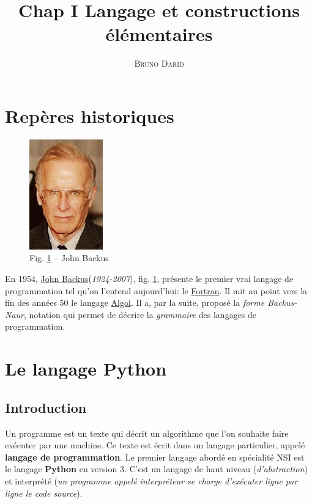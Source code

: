 \documentclass[11pt,french]{article}
\title{Chap I Langage et constructions élémentaires}
\author{\textsc{Bruno Darid}}
\makeatletter
\def\maxwidth{\ifdim\Gin@nat@width>\linewidth\linewidth
    \else\Gin@nat@width\fi}
\let\Oldincludegraphics\includegraphics
\renewcommand{\includegraphics}[1]{\Oldincludegraphics[width=.8\maxwidth]{#1}}
\makeatother
\begin{document}
    \renewcommand{\contentsname}{\textsc{Plan}}    
 	\maketitle
 	\tableofcontents
 

    \hypertarget{repuxe8res-historiques}{%
\section{Repères historiques}\label{repuxe8res-historiques}}

\begin{figure}[h]
	\begin{center}
		\includegraphics{John_Backus_3.png}
	\end{center}
	\caption{Fig. \ref{fig:backus} -- John Backus}
	\label{fig:backus}
\end{figure}

En 1954, \href{https://fr.wikipedia.org/wiki/John_Backus}{John
Backus}(\emph{1924-2007}), fig. \ref{fig:backus}, présente le premier vrai langage de
programmation tel qu'on l'entend aujourd'hui: le
\href{https://fr.wikipedia.org/wiki/Fortran}{Fortran}. Il mit au point
vers la fin des années 50 le langage
\href{https://fr.wikipedia.org/wiki/Algol_(langage)}{Algol}. Il a, par
la suite, proposé la \emph{forme Backus-Naur}, notation qui permet de
décrire la \emph{grammaire} des langages de programmation.

    \hypertarget{le-langage-python}{%
\section{Le langage Python}\label{le-langage-python}}

 \hypertarget{intro}{%
\subsection{Introduction}\label{intro}}

  Un programme est un texte qui décrit un algorithme que l'on souhaite
  faire exécuter par une machine. Ce texte est écrit dans un langage
  particulier, appelé \textbf{langage de programmation}. Le premier
  langage abordé en spécialité NSI est le langage \textbf{Python} en
  version 3. C'est un langage de haut niveau (\emph{d'abstraction}) et
  interprété (\emph{un programme appelé interpréteur se charge
  d'exécuter ligne par ligne le code \og source\fg}).
\end{document}
